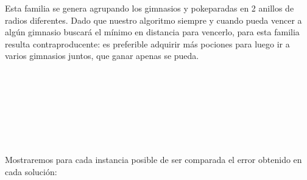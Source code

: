 Esta familia se genera agrupando los gimnasios y pokeparadas en 2 anillos de radios diferentes. Dado que nuestro algoritmo siempre y cuando pueda vencer a alg\'un gimnasio buscará el m\'inimo en  distancia para vencerlo, para esta familia resulta contraproducente: es preferible adquirir m\'as pociones para luego ir a varios gimnasios juntos, que ganar apenas se pueda.\\\\\\\\\\\\\\\
\vspace*{0.3cm} \vspace*{0.3cm}
\begin{figure} [!ht]
 \centering
       \label{fig:anilloexacto}
    \label{fig:anillogoloso}
    \end{figure}
\vspace*{0.3cm} \vspace*{0.3cm}

Mostraremos para cada instancia posible de ser comparada el error obtenido en cada soluci\'on:

